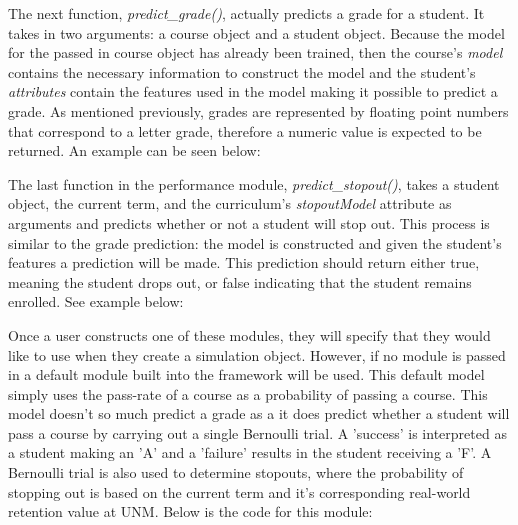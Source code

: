\documentclass[botnum, fleqn]{unmeethesis}
\begin{document}
  

  The next function, \textit{predict\_grade()}, actually predicts a grade for a student. It takes in two arguments: a course object and a student object. Because the model for the passed in course object has already been trained, then the course's \textit{model} contains the necessary information to construct the model and the student's \textit{attributes} contain the features used in the model making it possible to predict a grade. As mentioned previously, grades are represented by floating point numbers that correspond to a letter grade, therefore a numeric value is expected to be returned. An example can be seen below:

  

  The last function in the performance module, \textit{predict\_stopout()}, takes a student object, the current term, and the curriculum's \textit{stopoutModel} attribute as arguments and predicts whether or not a student will stop out. This process is similar to the grade prediction: the model is constructed and given the student's features a prediction will be made. This prediction should return either true, meaning the student drops out, or false indicating that the student remains enrolled. See example below:

  

  Once a user constructs one of these modules, they will specify that they would like to use when they create a simulation object. However, if no module is passed in a default module built into the framework will be used. This default model simply uses the pass-rate of a course as a probability of passing a course. This model doesn't so much predict a grade as a it does predict whether a student will pass a course by carrying out a single Bernoulli trial. A 'success' is interpreted as a student making an 'A' and a 'failure' results in the student receiving a 'F'. A Bernoulli trial is also used to determine stopouts, where the probability of stopping out is based on the current term and it's corresponding real-world retention value at UNM. Below is the code for this module:

  
\end{document}
